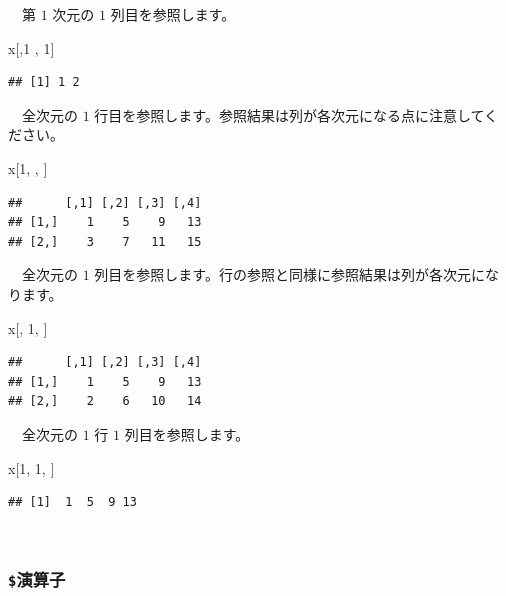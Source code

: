 \documentclass[
  12pt,
]{book}
\newenvironment{Shaded}{\begin{snugshade}}{\end{snugshade}}
\newcommand{\DecValTok}[1]{\textcolor[rgb]{0.00,0.00,0.81}{#1}}
\newcommand{\NormalTok}[1]{#1}
\begin{document}
　第 \(1\) 次元の \(1\) 列目を参照します。

\begin{Shaded}
\begin{Highlighting}[]
\NormalTok{x[,}\DecValTok{1}\NormalTok{ , }\DecValTok{1}\NormalTok{]}
\end{Highlighting}
\end{Shaded}

\begin{verbatim}
## [1] 1 2
\end{verbatim}

　全次元の \(1\) 行目を参照します。参照結果は列が各次元になる点に注意してください。

\begin{Shaded}
\begin{Highlighting}[]
\NormalTok{x[}\DecValTok{1}\NormalTok{, , ]}
\end{Highlighting}
\end{Shaded}

\begin{verbatim}
##      [,1] [,2] [,3] [,4]
## [1,]    1    5    9   13
## [2,]    3    7   11   15
\end{verbatim}

　全次元の \(1\) 列目を参照します。行の参照と同様に参照結果は列が各次元になります。

\begin{Shaded}
\begin{Highlighting}[]
\NormalTok{x[, }\DecValTok{1}\NormalTok{, ]}
\end{Highlighting}
\end{Shaded}

\begin{verbatim}
##      [,1] [,2] [,3] [,4]
## [1,]    1    5    9   13
## [2,]    2    6   10   14
\end{verbatim}

　全次元の \(1\) 行 \(1\) 列目を参照します。

\begin{Shaded}
\begin{Highlighting}[]
\NormalTok{x[}\DecValTok{1}\NormalTok{, }\DecValTok{1}\NormalTok{, ]}
\end{Highlighting}
\end{Shaded}

\begin{verbatim}
## [1]  1  5  9 13
\end{verbatim}

　

\hypertarget{ux6f14ux7b97ux5b50-2}{%
\subsubsection{\texorpdfstring{\texttt{\$}演算子}{\$演算子}}\label{ux6f14ux7b97ux5b50-2}}
\end{document}
